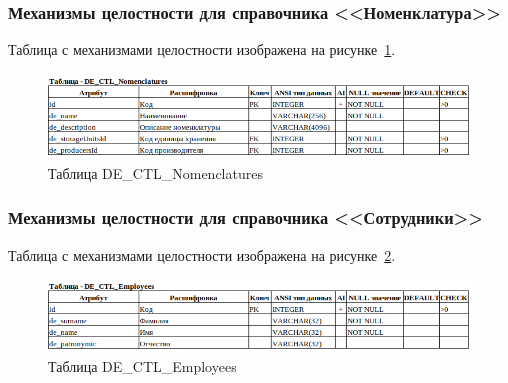 
\subsubsection{Механизмы целостности для справочника <<Номенклатура>>}

Таблица с механизмами целостности изображена на рисунке~\ref{fig:Logic_DE_CTL_Nomenclatures}.

\begin{figure}[!h]
    \centering

    \includegraphics[width=18cm]
    {assets/database/Types/DE_CTL_Nomenclatures.png}

    \caption{Таблица DE\_CTL\_Nomenclatures}

    \label{fig:Logic_DE_CTL_Nomenclatures}
\end{figure}


\subsubsection{Механизмы целостности для справочника <<Сотрудники>>}

Таблица с механизмами целостности изображена на рисунке~\ref{fig:Logic_DE_CTL_Employees}.

\begin{figure}[!h]
    \centering

    \includegraphics[width=18cm]
    {assets/database/Types/DE_CTL_Employees.png}

    \caption{Таблица DE\_CTL\_Employees}

    \label{fig:Logic_DE_CTL_Employees}
\end{figure}


